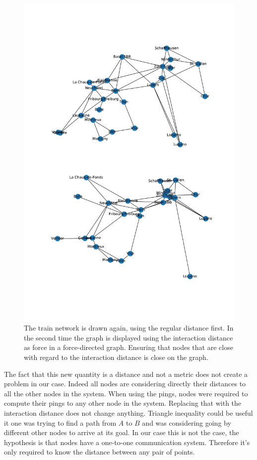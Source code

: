 \documentclass[a4paper,11pt,oneside]{report}
\begin{document}
\begin{figure}[!h] 
\centering
\includegraphics[width=350pt]{figures/CFF-NewDistances}
\caption{The train network is drawn again, using the regular distance first. In
  the second time the graph is displayed using the interaction distance as
  force in a force-directed graph. Ensuring that nodes that are close with
  regard to the interaction distance is close on the graph.}
  \label{fig:CFF-NewDistances}
\end{figure}

The fact that this new quantity is a distance and not a metric does not create
a problem in our case. Indeed all nodes are considering directly their distances
to all the other nodes in the system. When using the pings, nodes were required
to compute their pings to any other node in the system. Replacing that with the
interaction distance does not change anything. Triangle inequality could be
useful it one was trying to find a path from $A$ to $B$ and was considering
going by different other nodes to arrive at its goal. In our case this is not
the case, the hypothesis is that nodes have a one-to-one communication system.
Therefore it's only required to know the distance between any pair of points.
\end{document}
